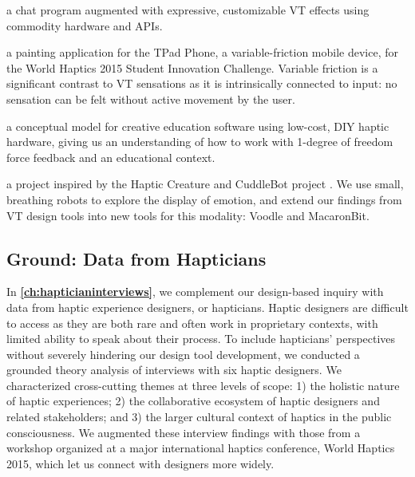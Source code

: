  a chat program augmented with expressive, customizable VT effects using commodity hardware and APIs.
	
  a painting application for the TPad Phone, a variable-friction mobile device, for the World Haptics 2015 Student Innovation Challenge. 
	Variable friction is a significant contrast to VT sensations as it is intrinsically connected to input: no sensation can be felt without active movement by the user.
	
 a conceptual model for creative education software using low-cost, DIY haptic hardware, giving us an understanding of how to work with 1-degree of freedom force feedback and an educational context.

 a project inspired by the Haptic Creature \cite{Yohanan2011affectivetouch,Yohanan2011affectdisplay,Chang2010} and CuddleBot project \cite{Allen2015cuddlebot}.
	We use small, breathing robots to explore the display of emotion, and extend our findings from VT design tools into new tools for this modality: Voodle and MacaronBit.





\subsection{Ground: Data from Hapticians}
In \textbf{\autoref{ch:hapticianinterviews}}, we complement our design-based inquiry with data from haptic experience designers, or  hapticians.
Haptic designers are difficult to access as they are both rare and often work in proprietary contexts, with limited ability to speak about their process.
To include hapticians' perspectives without severely hindering our design tool development, we conducted a grounded theory analysis of interviews with six haptic designers.
We characterized cross-cutting themes at three levels of scope: 1) the holistic nature of haptic experiences; 2) the collaborative ecosystem of haptic designers and related stakeholders; and 3) the larger cultural context of haptics in the public consciousness.
We augmented these interview findings with those from a workshop  organized at a major international haptics conference, World Haptics 2015, which let us connect with designers more widely.


